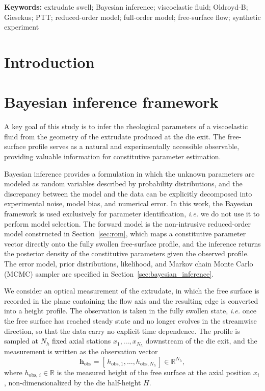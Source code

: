 \documentclass{elsarticle}
\newcommand{\ie}{\emph{i.e.}\xspace}
\renewcommand{\vec}[1]{\boldsymbol{#1}}
\newcommand{\obs}{\mathrm{obs}}
\begin{document}
\noindent\textbf{Keywords:} extrudate swell; Bayesian inference; viscoelastic
fluid; Oldroyd-B; Giesekus; PTT; reduced-order model; full-order model;
free-surface flow; synthetic experiment

\section{Introduction}

\section{Bayesian inference framework}
\label{sec:bayes}

A key goal of this study is to infer the rheological parameters of a viscoelastic fluid from the geometry of the extrudate produced at the die exit. The free-surface profile serves as a natural and experimentally accessible observable, providing valuable information for constitutive parameter estimation.

Bayesian inference provides a formulation in which the unknown parameters are
modeled as random variables described by probability distributions, and the
discrepancy between the model and the data can be explicitly decomposed into
experimental noise, model bias, and numerical error. In this work, the Bayesian
framework is used exclusively for parameter identification, \ie we do not use it
to perform model selection. The forward model is the non-intrusive reduced-order
model constructed in Section~\ref{sec:rom}, which maps a constitutive parameter
vector directly onto the fully swollen free-surface profile, and the inference
returns the posterior density of the constitutive parameters given the observed
profile. The error model, prior distributions, likelihood, and Markov chain
Monte Carlo (MCMC) sampler are specified in Section~\ref{sec:bayesian_inference}.


We consider an optical measurement of the extrudate, in which the free surface is recorded in the plane containing the flow axis and the
resulting edge is converted into a height profile. The observation is taken in
the fully swollen state, \ie once the free surface has reached steady state and
no longer evolves in the streamwise direction, so that the data carry no
explicit time dependence. The profile is sampled at $N_h$ fixed axial stations
$x_{1},\dots,x_{N_h}$ downstream of the die exit, and the measurement is
written as the observation vector
\begin{equation}
\vec{h}_{\obs}
=
[\,h_{\obs,1},\dots,h_{\obs,N_h}\,] \in \mathbb{R}^{N_h},
\label{eq:observation_vector}
\end{equation}
where $h_{\obs,\,i} \in \mathbb{R}$ is the measured height of the free surface
at the axial position $x_{i}$, non-dimensionalized by the die half-height $H$.
\end{document}

